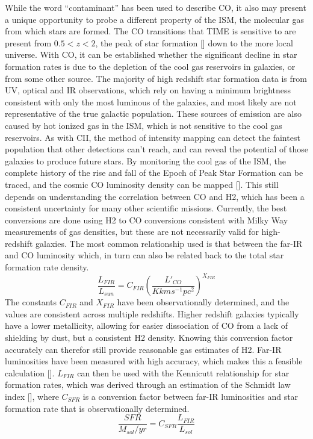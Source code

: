 \documentclass[manuscript]{aastex}
\begin{document}
While the word ``contaminant'' has been used to describe CO, it also may present a unique opportunity to probe a different property of the ISM, the molecular gas from which stars are formed. The CO transitions that TIME is sensitive to are present from $0.5 < z < 2$, the peak of star formation [\cite{Madau2014}] down to the more local universe.  With CO, it can be established whether the significant decline in star formation rates is due to the depletion of the cool gas reservoirs in galaxies, or from some other source. The majority of high redshift star formation data is from UV, optical and IR observations, which rely on having a minimum brightness consistent with only the most luminous of the galaxies, and most likely are not representative of the true galactic population. These sources of emission are also caused by hot ionized gas in the ISM, which is not sensitive to the cool gas reservoirs. As with CII, the method of intensity mapping can detect the faintest population that other detections can't reach, and can reveal the potential of those galaxies to produce future stars. By monitoring the cool gas of the ISM, the complete history of the rise and fall of the Epoch of Peak Star Formation can be traced, and the cosmic CO luminosity density can be mapped [\cite{Kovetz2017}]. This still depends on understanding the correlation between CO and H2, which has been a consistent uncertainty for many other scientific missions. Currently, the best conversions are done using H2 to CO conversions consistent with Milky Way measurements of gas densities, but these are not necessarily valid for high-redshift galaxies. The most common relationship used is that between the far-IR and CO luminosity which, in turn can also be related back to the total star formation rate density. 
\begin{equation}
\frac{L_{FIR}}{L_{sun}} = C_{FIR}(\frac{L'_{CO}}{K km s^{-1} pc^{2}})^{X_{FIR}}
\end{equation}
The constants $C_{FIR}$ and $X_{FIR}$ have been observationally determined, and the values are consistent across multiple redshifts. Higher redshift galaxies typically have a lower metallicity, allowing for easier dissociation of CO from a lack of shielding by dust, but a consistent H2 density. Knowing this conversion factor accurately can therefor still provide reasonable gas estimates of H2.  Far-IR luminosities have been measured with high accuracy, which makes this a feasible calculation [\cite{Carilli2013}].  $L_{FIR}$ can then be used with the Kennicutt relationship for star formation rates, which was derived through an estimation of the Schmidt law index [\cite{Kennicutt1998}], where $C_{SFR}$ is a conversion factor between far-IR luminosities and star formation rate that is observationally determined. 
\begin{equation}
\frac{SFR}{M_{sol}/yr} = C_{SFR}\frac{L_{FIR}}{L_{sol}}
\end{equation}
\end{document}
